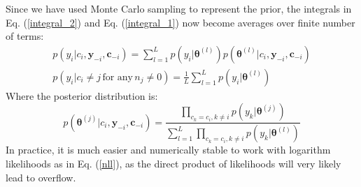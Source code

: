 Since we have used Monte Carlo sampling to represent the prior, the integrals in Eq. (\ref{integral_2}) and Eq. (\ref{integral_1}) now become averages over finite number of terms:
\begin{equation}
\begin{gathered}
p(y_i|c_i, \bm{y}_{-i}, \bm{c}_{-i}) = 
\sum_{l=1}^L p(y_i|\bm{\theta}^{(l)})
p(\bm{\theta}^{(l)}|c_i, \bm{y}_{-i}, \bm{c}_{-i})
\\
p(y_i|c_i \neq j \, \text{for any} \, n_j \neq 0) = 
\frac{1}{L} \sum_{l=1}^L p(y_i|\bm{\theta}^{(l)})
\end{gathered}
\label{MC_prior_integral}
\end{equation}
Where the posterior distribution is:
\begin{equation}
p(\bm{\theta}^{(j)}|c_i, \bm{y}_{-i}, \bm{c}_{-i}) = 
\frac{
\prod_{c_k=c_i, k \neq i} p(y_k|\bm{\theta}^{(j)})}
{\sum_{l=1}^L \prod_{c_k=c_i, k \neq i} p(y_k|\bm{\theta}^{(l)})}
\label{MC_posterior}
\end{equation}
In practice, it is much easier and numerically stable to work with logarithm likelihoods as in Eq. (\ref{nll}), as the direct product of likelihoods will very likely lead to overflow.


